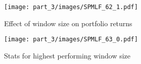 \begin{figure}[!htb]
    \centering
    \texttt{[image: part\_3/images/SPMLF\_62\_1.pdf]}
    \caption{Effect of window size on portfolio returns}
    \label{fig:part_3:ws_mvp}
\end{figure}

\begin{figure}[!htb]
    \centering
    \texttt{[image: part\_3/images/SPMLF\_63\_0.pdf]}
    \caption{Stats for highest performing window size}
    \label{fig:part_3:best_ws_mvp}
\end{figure}

